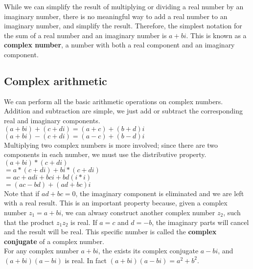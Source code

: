 While we can simplify the result of multiplying or dividing a real number by an imaginary number, there is no meaningful way to add a real number to an imaginary number, and simplify the result.  Therefore, the simplest notation for the sum of a real number and an imaginary number is $a + bi$.  This is known as a {\bf complex number}, a number with both a real component and an imaginary component.\\

\subsection{Complex arithmetic}

  We can perform all the basic arithmetic operations on complex numbers.  Addition and subtraction are simple, we just add or subtract the corresponding real and imaginary components.\\

\tab$(a + bi) + (c + di) = (a+c) + (b+d)i$\\

\tab$(a + bi) - (c + di) = (a-c) + (b-d)i$\\

Multiplying two complex numbers is more involved; since there are two components in each number, we must use the distributive property.\\

\tab$(a + bi) * (c + di)$\\

\tab$= a*(c + di ) + bi * (c + di)$\\

\tab$= ac + adi + bci +bd(i*i)$\\

\tab$= (ac - bd) + (ad + bc)i$\\

Note that if $ad + bc = 0$, the imaginary component is eliminated and we are left with a real result.  This is an important property because, given a complex number $z_1 = a + bi$, we can alwasy construct another complex number $z_2$, such that the product $z_1z_2$ is real.  If $a = c$ and $d = -b$, the imaginary parts will cancel and the result will be real.  This specific number is called the {\bf complex conjugate} of a complex number.\\

For any complex number $a+bi$, the exists its complex conjugate $a-bi$, and $(a+bi)(a-bi)$ is real.  In fact $(a+bi)(a-bi) = a^2 + b^2$.\\

